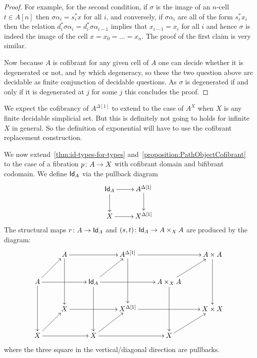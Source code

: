 \documentclass[reqno,10pt,a4paper,oneside,draft]{amsart}
\begin{document}
\begin{proof}
For example, for the second condition, if $\sigma$ is the image of an $n$-cell $t \in A[n]$ then $\sigma \alpha_i = s_i^* x$ for all $i$, and conversely, if $\sigma \alpha_i$ are all of the form $s_i^* x_i$ then the relation $d_i^* \sigma \alpha_i = d_{i}^* \sigma \alpha_{i-1}$ implies that $x_{i-1}=x_i$ for all $i$ and hence $\sigma$ is indeed the image of the cell $x=x_0= \dots = x_n$. The proof of the first claim is very similar.

Now because $A$ is cofibrant for any given cell of $A$ one can decide whether it is degenerated or not, and by which degeneracy, so these the two question above are decidable as finite conjunction of decidable questions. As $\sigma$ is degenerated if and only if it is degenerated at $j$ for some $j$ this concludes the proof.
\end{proof}


\begin{remark}
We expect the cofibrancy of $A^{\Delta[1]}$ to extend to the case of $A^{X}$ when $X$ is any finite decidable simplicial set. But this is definitely not going to holds for infinite $X$ in general. So the definition of exponential will have to use the cofibrant replacement construction.
\end{remark} 


\bigskip


We now extend~\cref{thm:id-types-for-types} and~\cref{proposition:PathObjectCofibrant} 
to the case of a fibration $p \colon A \rightarrow X$ with cofibrant domain and bifibrant codomain. We define $\mathsf{Id}_A$ 
via the pullback diagram
\[
\xymatrix{
\Id_A \ar[r] \ar[d] & A^{\Delta[1]} \ar[d] \\
X \ar[r] & X^{\Delta[1]} \\
}
\]
The structural maps $r \colon A \rightarrow \mathsf{Id}_A$ and $(s, t) \colon \mathsf{Id}_A \rightarrow A \times_{X} A$ are produced by the diagram:
\[
\xymatrix{
& A \ar[rr] \ar[dd] & & A^{\Delta[1]} \ar[rr] \ar[dd] & & A \times A \ar[dd] \\
A \ar[ur] \ar[rr] \ar[dd] & & \Id_A \ar[ur] \ar[rr] \ar[dd] & & A \times_{X} A \ar[ur] \ar[dd] \\
& X \ar[rr] & & X^{\Delta[1]} \ar[rr] & & X \times X \\
X \ar[ur] \ar[rr] & & X \ar[rr] \ar[ur] & & X \ar[ur] \\ 
}
\]
where the three square in the vertical/diagonal direction are pullbacks.
\end{document}
